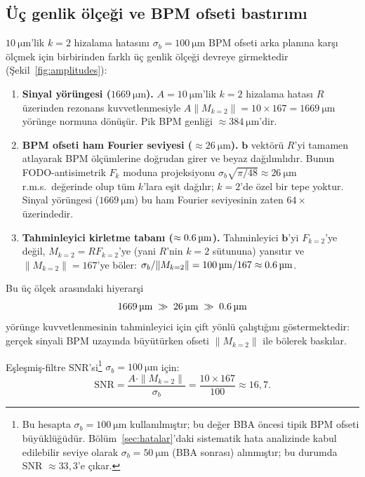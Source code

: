 \documentclass[preprint,12pt]{elsarticle}
\begin{document}
\subsection{Üç genlik ölçeği ve BPM ofseti bastırımı}

$\SI{10}{\micro\meter}$'lik $k=2$ hizalama hatasını $\sigma_b=\SI{100}{\micro\meter}$
BPM ofseti arka planına karşı ölçmek için birbirinden farklı üç genlik ölçeği
devreye girmektedir (Şekil~\ref{fig:amplitudes}):

\begin{enumerate}
\item \textbf{Sinyal yörüngesi ($\SI{1669}{\micro\meter}$).}
  $A=\SI{10}{\micro\meter}$'lik $k=2$ hizalama hatası $R$ üzerinden
  rezonans kuvvetlenmesiyle $A\|M_{k=2}\|=10\times167=\SI{1669}{\micro\meter}$
  yörünge normuna dönüşür. Pik BPM genliği $\approx\SI{384}{\micro\meter}$'dir.

\item \textbf{BPM ofseti ham Fourier seviyesi ($\approx\SI{26}{\micro\meter}$).}
  $\mathbf{b}$ vektörü $R$'yi tamamen atlayarak BPM ölçümlerine doğrudan girer
  ve beyaz dağılımlıdır. Bunun FODO-antisimetrik $F_k$ moduna projeksiyonu
  $\sigma_b\sqrt{\pi/48}\approx\SI{26}{\micro\meter}$ r.m.s.\ değerinde olup
  tüm $k$'lara eşit dağılır; $k=2$'de özel bir tepe yoktur.
  Sinyal yörüngesi ($\SI{1669}{\micro\meter}$) bu ham Fourier seviyesinin
  zaten $64\times$ üzerindedir.

\item \textbf{Tahminleyici kirletme tabanı ($\approx\SI{0{,}6}{\micro\meter}$).}
  Tahminleyici $\mathbf{b}$'yi $F_{k=2}$'ye değil, $M_{k=2}=RF_{k=2}$'ye
  (yani $R$'nin $k=2$ sütununa) yansıtır ve $\|M_{k=2}\|=167$'ye böler:
  $\sigma_b/\|M_{k=2}\|=\SI{100}{\micro\meter}/167\approx\SI{0{,}6}{\micro\meter}$.
\end{enumerate}

Bu üç ölçek arasındaki hiyerarşi
\begin{equation}
  \SI{1669}{\micro\meter}\;\gg\;\SI{26}{\micro\meter}\;\gg\;\SI{0{,}6}{\micro\meter}
\end{equation}
yörünge kuvvetlenmesinin tahminleyici için çift yönlü çalıştığını göstermektedir:
gerçek sinyali BPM uzayında büyütürken ofseti $\|M_{k=2}\|$ ile bölerek baskılar.

Eşleşmiş-filtre SNR'si\footnote{Bu hesapta $\sigma_b=\SI{100}{\micro\meter}$
kullanılmıştır; bu değer BBA öncesi tipik BPM ofseti büyüklüğüdür.
Bölüm~\ref{sec:hatalar}'daki sistematik hata analizinde kabul edilebilir
seviye olarak $\sigma_b=\SI{50}{\micro\meter}$ (BBA sonrası) alınmıştır;
bu durumda SNR $\approx 33{,}3$'e çıkar.} $\sigma_b=\SI{100}{\micro\meter}$ için:
\begin{equation}
  \mathrm{SNR} = \frac{A\cdot\|M_{k=2}\|}{\sigma_b}
               = \frac{10\times167}{100} \approx 16{,}7.
\end{equation}
\end{document}
